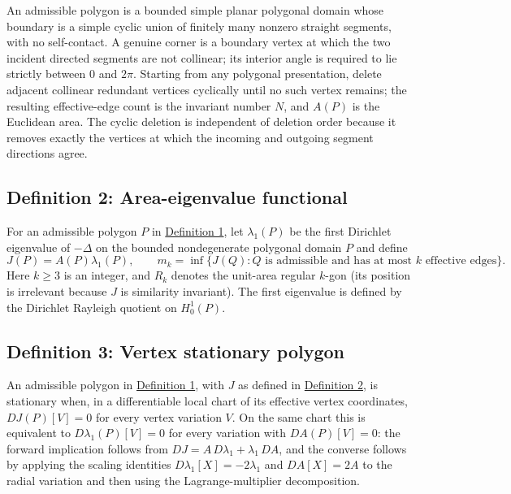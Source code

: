 \documentclass[11pt]{article}
\begin{document}
An admissible polygon is a bounded simple planar polygonal domain whose
boundary is a simple cyclic union of finitely many nonzero straight
segments, with no self-contact. A genuine corner is a boundary vertex at
which the two incident directed segments are not collinear; its interior
angle is required to lie strictly between \(0\) and \(2\pi\). Starting
from any polygonal presentation, delete adjacent collinear redundant
vertices cyclically until no such vertex remains; the resulting
effective-edge count is the invariant number \(N\), and \(A(P)\) is the
Euclidean area. The cyclic deletion is independent of deletion order
because it removes exactly the vertices at which the incoming and
outgoing segment directions agree.

\subsection{Definition 2: Area-eigenvalue
functional}\label{def-j-functional}

For an admissible polygon \(P\) in
\hyperref[def-admissible-polygon]{Definition 1}, let \(\lambda_1(P)\) be
the first Dirichlet eigenvalue of \(-\Delta\) on the bounded
nondegenerate polygonal domain \(P\) and define \[
J(P)=A(P)\lambda_1(P),\qquad
m_k=\inf\{J(Q):Q\text{ is admissible and has at most }k\text{ effective edges}\}.
\] Here \(k\ge3\) is an integer, and \(R_k\) denotes the unit-area
regular \(k\)-gon (its position is irrelevant because \(J\) is
similarity invariant). The first eigenvalue is defined by the Dirichlet
Rayleigh quotient on \(H_0^1(P)\).

\subsection{Definition 3: Vertex stationary
polygon}\label{def-stationary-polygon}

An admissible polygon in \hyperref[def-admissible-polygon]{Definition
1}, with \(J\) as defined in \hyperref[def-j-functional]{Definition 2},
is stationary when, in a differentiable local chart of its effective
vertex coordinates, \(DJ(P)[V]=0\) for every vertex variation \(V\). On
the same chart this is equivalent to \(D\lambda_1(P)[V]=0\) for every
variation with \(DA(P)[V]=0\): the forward implication follows from
\(DJ=A\,D\lambda_1+\lambda_1\,DA\), and the converse follows by applying
the scaling identities \(D\lambda_1[X]=-2\lambda_1\) and \(DA[X]=2A\) to
the radial variation and then using the Lagrange-multiplier
decomposition.
\end{document}
